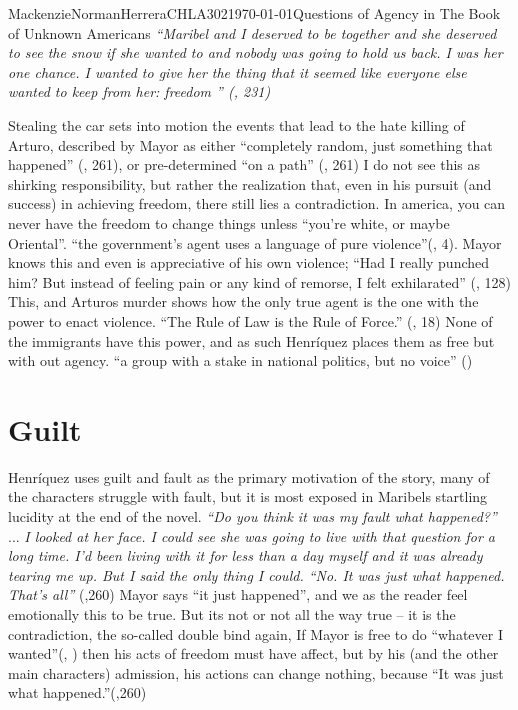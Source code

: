 \documentclass{article}
\begin{document}
\begin{mla}{Mackenzie}{Norman}{Herrera}{CHLA302}{\today}{Questions of Agency in The Book of Unknown Americans}
\textit{``Maribel and I deserved to be together and she deserved to see the snow if she wanted to and nobody was going to hold us back. I was her one chance. I wanted to give her the thing that it seemed like everyone else wanted to keep from her: freedom '' (\cite{Henriquez2014-sh}, 231)}

Stealing the car sets into motion the events that lead to the hate killing of Arturo, described by Mayor as either ``completely random, just something that happened'' (\cite{Henriquez2014-sh}, 261), or pre-determined ``on a path'' (\cite{Henriquez2014-sh}, 261) I do not see this as shirking responsibility, but rather the realization that, even in his pursuit (and success) in achieving freedom, there still lies a contradiction. In america, you can never have the freedom to change things unless ``you're white, or maybe Oriental''. ``the government's agent uses a language of pure violence''(\cite{wretched}, 4). Mayor knows this and even is appreciative of his own violence; ``Had I really punched him? But instead of feeling pain or any kind of remorse, I felt exhilarated'' (\cite{Henriquez2014-sh}, 128) This, and Arturos murder shows how the only true agent is the one with the power to enact violence. ``The Rule of Law is the Rule of Force.'' (\cite{loves-bdy}, 18) None of the immigrants have this power, and as such Henríquez places them as free but with out agency. ``a group with a stake in national politics, but no voice'' (\cite{Lutes_Travis_2021})
\section*{Guilt}
Henríquez uses guilt and fault as the primary motivation of the story, many of the characters struggle with fault, but it is most exposed in Maribels startling lucidity at the end of the novel.
\noindent\linebreak
\textit{``Do you think it was my fault what happened?'' }
...
\noindent\linebreak
\textit{I looked at her face. I could see she was going to live with that question for a long time. I'd been living with it for less than a day myself and it was already tearing me up. But I said the only thing I could. ``No. It was just what happened. That's all''} (\cite{Henriquez2014-sh},260)
\noindent\linebreak
Mayor says ``it just happened'', and we as the reader feel emotionally this to be true. But its not or not all the way true -- it is the contradiction, the so-called double bind again, If Mayor is free to do ``whatever I wanted''(\cite{Henriquez2014-sh}, ) then his acts of freedom must have affect, but by his (and the other main characters) admission, his actions can change nothing, because ``It was just what happened.''(\cite{Henriquez2014-sh},260)


\end{mla}
\end{document}
